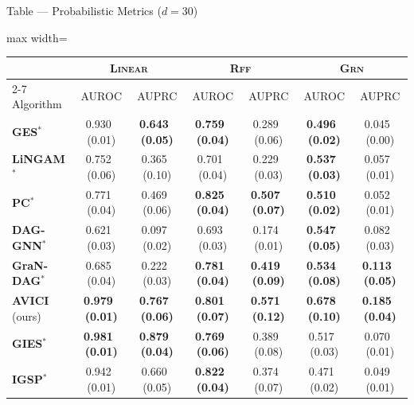 \documentclass[aspectratio=169,10pt]{beamer}
\newcommand{\err}[1]{\tiny{$\,$(#1)}}
\newcommand{\highlight}[1]{\textbf{#1}}
\newcommand{\domain}[1]{\textsc{#1}}
\newcommand{\ges}{\textbf{GES}}
\newcommand{\pc}{\textbf{PC}}
\newcommand{\lingam}{\textbf{LiNGAM}}
\newcommand{\daggnn}{\textbf{DAG-GNN}}
\newcommand{\grandag}{\textbf{GraN-DAG}}
\newcommand{\oursobserv}{\textbf{AVICI} (ours)}
\newcommand{\gies}{\textbf{GIES}}
\newcommand{\igsp}{\textbf{IGSP}}
\begin{document}
\begin{frame}{Table --- Probabilistic Metrics ($d=30$)}
\scriptsize
\begin{adjustbox}{max width=\textwidth}
\begin{tabular}{lcccccc}
\toprule
 &           \multicolumn{2}{c}{\domain{Linear}}            &            \multicolumn{2}{c}{\domain{Rff}}           &        \multicolumn{2}{c}{\domain{Grn}}       \\
\cmidrule{2-7}
Algorithm &              AUROC &               AUPRC  &              AUROC &               AUPRC &              AUROC &               AUPRC\\
\midrule
\ges${}^*$       &              0.930 \err{0.01} &  \highlight{0.643 \err{0.05}} &  \highlight{0.759 \err{0.04}} &              0.289 \err{0.06} &  \highlight{0.496 \err{0.02}} &              0.045 \err{0.00} \\
\lingam${}^*$    &              0.752 \err{0.06} &              0.365 \err{0.10} &              0.701 \err{0.04} &              0.229 \err{0.03} &  \highlight{0.537 \err{0.03}} &              0.057 \err{0.01} \\
\pc${}^*$        &              0.771 \err{0.04} &              0.469 \err{0.06} &  \highlight{0.825 \err{0.04}} &  \highlight{0.507 \err{0.07}} &  \highlight{0.510 \err{0.02}} &              0.052 \err{0.01} \\
\daggnn${}^*$    &              0.621 \err{0.03} &              0.097 \err{0.02} &              0.693 \err{0.03} &              0.174 \err{0.01} &  \highlight{0.547 \err{0.05}} &              0.082 \err{0.03} \\
\grandag${}^*$ &                0.685 \err{0.04} &              0.222 \err{0.03} &  \highlight{0.781 \err{0.04}} &  \highlight{0.419 \err{0.09}} & \highlight{0.534 \err{0.08}} & \highlight{0.113 \err{0.05}} \\
\oursobserv      &  \highlight{0.979 \err{0.01}} &  \highlight{0.767 \err{0.06}} &  \highlight{0.801 \err{0.07}} &  \highlight{0.571 \err{0.12}} &  \highlight{0.678 \err{0.10}} &  \highlight{0.185 \err{0.04}} \\
\midrule
\gies${}^*$      &  \highlight{0.981 \err{0.01}} &  \highlight{0.879 \err{0.04}} &  \highlight{0.769 \err{0.06}} &              0.389 \err{0.08} &              0.517 \err{0.03} &              0.070 \err{0.01} \\
\igsp${}^*$      &              0.942 \err{0.01} &              0.660 \err{0.05} &  \highlight{0.822 \err{0.04}} &              0.374 \err{0.07} &              0.471 \err{0.02} &              0.049 \err{0.01} \\

\end{tabular}
\end{adjustbox}
\end{frame}
\end{document}
